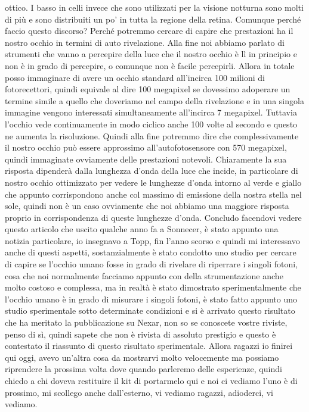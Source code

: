 {ottico. I basso in celli invece che sono utilizzati per la visione notturna sono molti di più e sono distribuiti un po' in tutta la regione della retina. Comunque perché faccio questo discorso? Perché potremmo cercare di capire che prestazioni ha il nostro occhio in termini di auto rivelazione. Alla fine noi abbiamo parlato di strumenti che vanno a percepire della luce che il nostro occhio è lì in principio e non è in grado di percepire, o comunque non è facile percepirli. Allora in totale posso immaginare di avere un occhio standard all'incirca 100 milioni di fotorecettori, quindi equivale al dire 100 megapixel se dovessimo adoperare un termine simile a quello che doveriamo nel campo della rivelazione e in una singola immagine vengono interessati simultaneamente all'incirca 7 megapixel. Tuttavia l'occhio vede continuamente in modo ciclico anche 100 volte al secondo e questo ne aumenta la risoluzione. Quindi alla fine potremmo dire che complessivamente il nostro occhio può essere approssimo all'autofotosensore con 570 megapixel, quindi immaginate ovviamente delle prestazioni notevoli. Chiaramente la sua risposta dipenderà dalla lunghezza d'onda della luce che incide, in particolare di nostro occhio ottimizzato per vedere le lunghezze d'onda intorno al verde e giallo che appunto corrispondono anche col massimo di emissione della nostra stella nel sole, quindi non è un caso ovviamente che noi abbiamo una maggiore risposta proprio in corrispondenza di queste lunghezze d'onda. Concludo facendovi vedere questo articolo che uscito qualche anno fa a Sonnecer, è stato appunto una notizia particolare, io insegnavo a Topp, fin l'anno scorso e quindi mi interessavo anche di questi aspetti, sostanzialmente è stato condotto uno studio per cercare di capire se l'occhio umano fosse in grado di rivelare di riperrare i singoli fotoni, cosa che noi normalmente facciamo appunto con della strumentazione anche molto costoso e complessa, ma in realtà è stato dimostrato sperimentalmente che l'occhio umano è in grado di misurare i singoli fotoni, è stato fatto appunto uno studio sperimentale sotto determinate condizioni e si è arrivato questo risultato che ha meritato la pubblicazione su Nexar, non so se conoscete vostre riviste, penso di sì, quindi sapete che non è rivista di assoluto prestigio e questo è contestato il riassunto di questo risultato sperimentale. Allora ragazzi io finirei qui oggi, avevo un'altra cosa da mostrarvi molto velocemente ma possiamo riprendere la prossima volta dove quando parleremo delle esperienze, quindi chiedo a chi doveva restituire il kit di portarmelo qui e noi ci vediamo l'uno è di prossimo, mi scollego anche dall'esterno, vi vediamo ragazzi, adioderci, vi vediamo.

}
